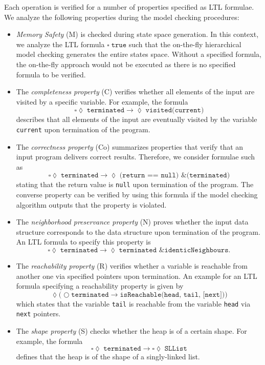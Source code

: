 \documentclass[a4paper, 12pt, twoside]{report}
\begin{document}
	Each operation is verified for a number of properties specified as LTL formulae. We analyze the following properties during the model checking procedures:
	
	\begin{itemize}
		\item \textit{Memory Safety} (M) is checked during state space generation. In this context, we analyze the LTL formula $\square\; \texttt{true}$ such that the on-the-fly hierarchical model checking generates the entire states space. Without a specified formula, the on-the-fly approach would not be executed as there is no specified formula to be verified.
		\item The \textit{completeness property} (C) verifies whether all elements of the input are visited by a specific variable. For example, the formula \[\square \lozenge\; \texttt{terminated} \rightarrow \lozenge\; \texttt{visited(current)}\] describes that all elements of the input are eventually visited by the variable \texttt{current} upon termination of the program. 
		\item The \textit{correctness property} (Co) summarizes properties that verify that an input program delivers correct results. Therefore, we consider formulae such as \[\square \lozenge\; \texttt{terminated} \rightarrow \lozenge\; \texttt{(return == null) \& (terminated)}\] stating that the return value is \texttt{null} upon termination of the program. The converse property can be verified by using this formula if the model checking algorithm outputs that the property is violated.
		\item The \textit{neighborhood preservance property} (N) proves whether the input data structure corresponds to the data structure upon termination of the program. An LTL formula to specify this property is \[\square \lozenge\; \texttt{terminated} \rightarrow \lozenge\; \texttt{terminated \& identicNeighbours}.\]
		\item The \textit{reachability property} (R) verifies whether a variable is reachable from another one via specified pointers upon termination. An example for an LTL formula specifying a reachability property is given by \[\lozenge\texttt{(}\bigcirc\texttt{terminated} \rightarrow \texttt{isReachable(head, tail, [next])}\texttt{)}\] which states that the variable \texttt{tail} is reachable from the variable \texttt{head} via \texttt{next} pointers.
		\item The \textit{shape property} (S) checks whether the heap is of a certain shape. For example, the formula \[\square\lozenge\;\texttt{terminated} \rightarrow \square\lozenge\;\texttt{SLList}\] defines that the heap is of the shape of a singly-linked list.
	\end{itemize}
	
\end{document}
